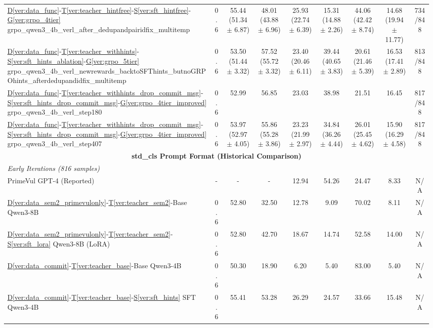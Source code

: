 \documentclass[12pt,a4paper]{article}
\newcommand{\vcode}[4]{\hyperref[#1]{D\ref*{#1}}-\hyperref[#2]{T\ref*{#2}}-\hyperref[#3]{S\ref*{#3}}-\hyperref[#4]{G\ref*{#4}}}
\newcommand{\vcodeSFT}[3]{\hyperref[#1]{D\ref*{#1}}-\hyperref[#2]{T\ref*{#2}}-\hyperref[#3]{S\ref*{#3}}}
\newcommand{\vcodeBase}[2]{\hyperref[#1]{D\ref*{#1}}-\hyperref[#2]{T\ref*{#2}}-Base}
\begin{document}
\begin{table}[H]
\begin{minipage}{\paperwidth}
{\begin{tabular}{lcccccccc}
\vcode{ver:data_func}{ver:teacher_hintfree}{ver:sft_hintfree}{ver:grpo_4tier} grpo_qwen3_4b_verl_after_dedupandpairidfix_multitemp & 0.6 & 55.44 (51.34 $\pm$ 6.87) & 48.01 (43.88 $\pm$ 6.96) & 25.93 (22.74 $\pm$ 6.39) & 15.31 (14.88 $\pm$ 2.26) & 44.06 (42.42 $\pm$ 8.74) & 14.68 (19.94 $\pm$ 11.77) & 734/848 \\
\vcode{ver:data_func}{ver:teacher_withhints}{ver:sft_hints_ablation}{ver:grpo_5tier} grpo_qwen3_4b_verl_newrewards_backtoSFThints_butnoGRPOhints_afterdedupandidfix_multitemp & 0.6 & 53.50 (51.44 $\pm$ 3.32) & 57.52 (55.72 $\pm$ 3.32) & 23.40 (20.46 $\pm$ 6.11) & 39.44 (40.65 $\pm$ 3.83) & 20.61 (21.46 $\pm$ 5.39) & 16.53 (17.41 $\pm$ 2.89) & 813/848 \\
\vcode{ver:data_func}{ver:teacher_withhints_drop_commit_msg}{ver:sft_hints_drop_commit_msg}{ver:grpo_4tier_improved} grpo_qwen3_4b_verl_step180 & 0.6 & 52.99 & 56.85 & 23.03 & 38.98 & 21.51 & 16.45 & 817/848 \\
\vcode{ver:data_func}{ver:teacher_withhints_drop_commit_msg}{ver:sft_hints_drop_commit_msg}{ver:grpo_4tier_improved} grpo_qwen3_4b_verl_step407 & 0.6 & 53.97 (52.97 $\pm$ 4.05) & 55.86 (55.28 $\pm$ 3.86) & 23.23 (21.99 $\pm$ 2.97) & 34.84 (36.26 $\pm$ 4.44) & 26.01 (25.45 $\pm$ 4.62) & 15.90 (16.29 $\pm$ 4.58) & 817/848 \\
\midrule
\multicolumn{9}{c}{\textbf{std\_cls Prompt Format (Historical Comparison)}} \\
\midrule
\multicolumn{9}{l}{\textit{Early Iterations (816 samples)}} \\
PrimeVul GPT-4 (Reported) & - & - & - & 12.94 & 54.26 & 24.47 & 8.33 & N/A \\
\vcodeBase{ver:data_sem2_primevulonly}{ver:teacher_sem2} Qwen3-8B & 0.6 & 52.80 & 32.50 & 12.78 & 9.09 & 70.02 & 8.11 & N/A \\
\vcodeSFT{ver:data_sem2_primevulonly}{ver:teacher_sem2}{ver:sft_lora} Qwen3-8B (LoRA) & 0.6 & 52.80 & 42.70 & 18.67 & 14.74 & 52.58 & 14.00 & N/A \\
\midrule
\vcodeBase{ver:data_commit}{ver:teacher_base} Qwen3-4B & 0.6 & 50.30 & 18.90 & 6.20 & 5.40 & 83.00 & 5.40 & N/A \\
\vcodeSFT{ver:data_commit}{ver:teacher_base}{ver:sft_hints} SFT Qwen3-4B & 0.6 & 55.41 & 53.28 & 26.29 & 24.57 & 33.66 & 15.48 & N/A \\
\bottomrule
\end{tabular}%
}
\end{minipage}
\end{table}
\end{document}
